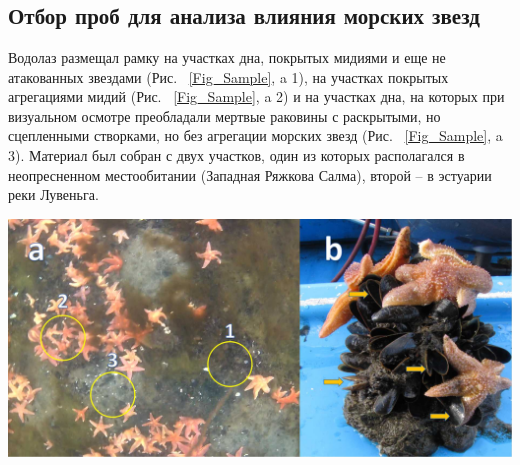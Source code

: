 \documentclass[20pt,a0,portrait]{a0poster}
\begin{document}
\begin{minipage}[t]{0.5\linewidth}

\section*{}

\subsection*{Отбор проб для анализа влияния морских звезд}

%
\begin{minipage}[t]{0.4\linewidth}
Водолаз размещал рамку на участках дна, покрытых мидиями и еще не атакованных звездами (Рис. ~\ref{Fig_Sample}, a 1), на участках покрытых агрегациями мидий  (Рис. ~\ref{Fig_Sample}, a 2) и на участках дна, на которых при визуальном осмотре преобладали мертвые раковины с раскрытыми, но сцепленными створками, но без агрегации морских звезд (Рис. ~\ref{Fig_Sample}, a 3). Материал был собран с двух участков, один из которых располагался в неопресненном местообитании (Западная Ряжкова Салма), второй -- в эстуарии реки Лувеньга.
\end{minipage}\hspace{1cm}
%
\begin{minipage}[t]{0.5\linewidth}		
	\begin{center}\vspace{0.1cm}
			\includegraphics[width=0.8\linewidth]{Samples.jpg}
			\label{Fig_Sample}
		\end{center}
\end{minipage}\hspace{0.5cm}




\end{minipage}
\end{document}
